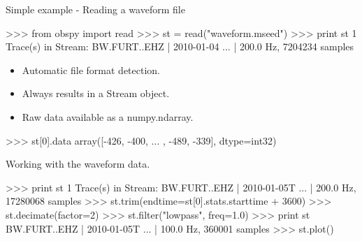\documentclass[handout]{beamer}
\begin{document}
\begin{frame}{Simple example - Reading a waveform file}
\begin{myColorBox}{0.95}{}

\begin{python}
>>> from obspy import read
>>> st = read("waveform.mseed")
>>> print st
1 Trace(s) in Stream:
BW.FURT..EHZ | 2010-01-04 ... | 200.0 Hz, 7204234 samples
\end{python}
\end{myColorBox}

\begin{itemize}
    \item Automatic file format detection.
    \item Always results in a Stream object.
    \item Raw data available as a numpy.ndarray.
\end{itemize}
\begin{myColorBox}{0.95}{}
\begin{python}
>>> st[0].data
array([-426, -400, ... , -489, -339], dtype=int32)
\end{python}
\end{myColorBox}
\end{frame}


\begin{frame}{Working with the waveform data.}
\begin{myColorBox}{0.95}{}

\begin{python}
>>> print st
1 Trace(s) in Stream:
BW.FURT..EHZ | 2010-01-05T ... | 200.0 Hz, 17280068 samples
>>> st.trim(endtime=st[0].stats.starttime + 3600)
>>> st.decimate(factor=2)
>>> st.filter("lowpass", freq=1.0)
>>> print st
BW.FURT..EHZ | 2010-01-05T ... | 100.0 Hz, 360001 samples
>>> st.plot()
\end{python}
\end{myColorBox}
\end{frame}
\end{document}

